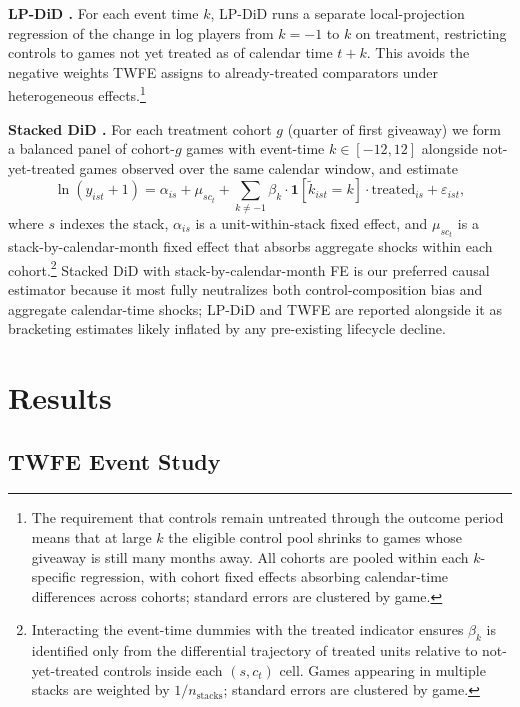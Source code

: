 \documentclass[11pt]{article}
\begin{document}
\textbf{LP-DiD \citep{dube2023}.} For each event time $k$, LP-DiD runs a separate
local-projection regression of the change in log players from $k = -1$ to $k$ on
treatment, restricting controls to games not yet treated as of calendar time
$t + k$. This avoids the negative weights TWFE assigns to already-treated
comparators under heterogeneous effects.\footnote{The requirement that controls
remain untreated through the outcome period means that at large $k$ the eligible
control pool shrinks to games whose giveaway is still many months away. All
cohorts are pooled within each $k$-specific regression, with cohort fixed
effects absorbing calendar-time differences across cohorts; standard errors are
clustered by game.}

\textbf{Stacked DiD \citep{cengiz2019}.} For each treatment
cohort $g$ (quarter of first giveaway) we form a balanced panel of cohort-$g$
games with event-time $k \in [-12, 12]$ alongside not-yet-treated games observed
over the same calendar window, and estimate
\begin{equation}
\label{eq:stacked}
\ln(y_{ist} + 1)
= \alpha_{is}
+ \mu_{sc_t}
+ \sum_{k \neq -1} \beta_k \cdot \mathbf{1}[\tilde k_{ist} = k] \cdot \text{treated}_{is}
+ \varepsilon_{ist},
\end{equation}
where $s$ indexes the stack, $\alpha_{is}$ is a unit-within-stack fixed effect,
and $\mu_{sc_t}$ is a stack-by-calendar-month fixed effect that absorbs aggregate
shocks within each cohort.\footnote{Interacting the event-time dummies with the
treated indicator ensures $\beta_k$ is identified only from the differential
trajectory of treated units relative to not-yet-treated controls inside each
$(s, c_t)$ cell. Games appearing in multiple stacks are weighted by
$1/n_{\text{stacks}}$; standard errors are clustered by game.} Stacked DiD with
stack-by-calendar-month FE is our preferred causal estimator because it most
fully neutralizes both control-composition bias and aggregate calendar-time
shocks; LP-DiD and TWFE are reported alongside it as bracketing estimates
likely inflated by any pre-existing lifecycle decline.

\section{Results}
\label{sec:results}

\subsection{TWFE Event Study}
\label{ssec:twfe}
\end{document}
